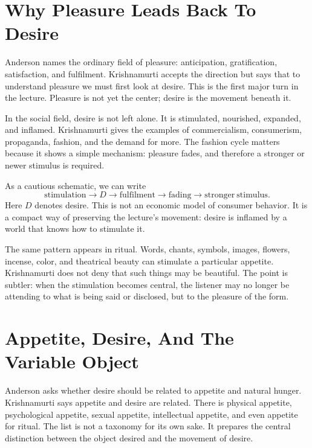 \section{Why Pleasure Leads Back To Desire}

Anderson names the ordinary field of pleasure: anticipation, gratification, satisfaction, and fulfilment. Krishnamurti accepts the direction but says that to understand pleasure we must first look at desire. This is the first major turn in the lecture. Pleasure is not yet the center; desire is the movement beneath it.

In the social field, desire is not left alone. It is stimulated, nourished, expanded, and inflamed. Krishnamurti gives the examples of commercialism, consumerism, propaganda, fashion, and the demand for more. The fashion cycle matters because it shows a simple mechanism: pleasure fades, and therefore a stronger or newer stimulus is required.

As a cautious schematic, we can write
\begin{equation}
\mathrm{stimulation}
\longrightarrow D
\longrightarrow \mathrm{fulfilment}
\longrightarrow \mathrm{fading}
\longrightarrow \mathrm{stronger\ stimulus}.
\end{equation}
Here \(D\) denotes desire. This is not an economic model of consumer behavior. It is a compact way of preserving the lecture's movement: desire is inflamed by a world that knows how to stimulate it.

The same pattern appears in ritual. Words, chants, symbols, images, flowers, incense, color, and theatrical beauty can stimulate a particular appetite. Krishnamurti does not deny that such things may be beautiful. The point is subtler: when the stimulation becomes central, the listener may no longer be attending to what is being said or disclosed, but to the pleasure of the form.

\section{Appetite, Desire, And The Variable Object}

Anderson asks whether desire should be related to appetite and natural hunger. Krishnamurti says appetite and desire are related. There is physical appetite, psychological appetite, sexual appetite, intellectual appetite, and even appetite for ritual. The list is not a taxonomy for its own sake. It prepares the central distinction between the object desired and the movement of desire.


